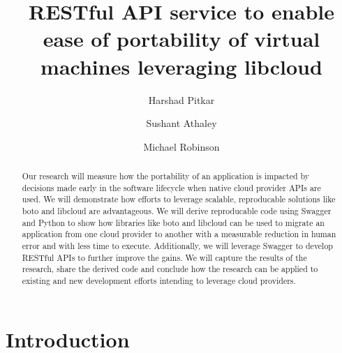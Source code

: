 % 
\title{RESTful API service to enable ease of portability of virtual
machines leveraging libcloud}


\author{Harshad Pitkar}

\author{Sushant Athaley}

\author{Michael Robinson}


\renewcommand{\shortauthors}{H. Pitkar, S. Athaley, M. Robinson}


\begin{abstract}
Our research will measure how the portability of an application is impacted by decisions 
made early in the software lifecycle when native cloud provider APIs are used. We will 
demonstrate how efforts to leverage scalable, reproducable solutions like boto and 
libcloud are advantageous. We will derive reproducable code using Swagger and Python
to show how libraries like boto and libcloud can be used to migrate an application from 
one cloud provider to another with a measurable reduction in human error and with less 
time to execute. Additionally, we will leverage Swagger to develop RESTful APIs to 
further improve the gains. We will capture the results of the research, share the derived 
code and conclude how the research can be applied to existing and new development efforts 
intending to leverage cloud providers. 
\end{abstract}



\maketitle

\section{Introduction}\label{introduction}

